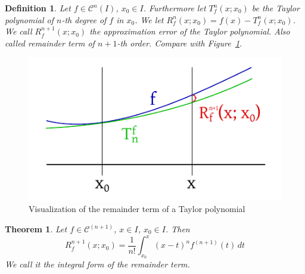 \documentclass{article}
\newtheorem{theorem}{Theorem}  \numberwithin{theorem}{section}
\newtheorem{definition}{Definition}  \numberwithin{definition}{section}
\begin{document}
\begin{definition} %
  \label{def4}
  Let $f \in \mathcal C^n(I)$, $x_0 \in I$. Furthermore let $T_f^n(x; x_0)$ be the Taylor polynomial of $n$-th degree of $f$ in $x_0$.
  We let $R_f^n(x; x_0) = f(x) - T_f^n(x; x_0)$. We call $R_f^{n+1}(x; x_0)$ the \emph{approximation error} of the Taylor polynomial.
  Also called \emph{remainder term of $n+1$-th order}. Compare with Figure~\ref{img:taylor-rem}.
\end{definition}

\begin{figure}[t]
  \begin{center}
    \includegraphics{img/27_taylor_remainder.pdf}
    \caption{Visualization of the remainder term of a Taylor polynomial}
    \label{img:taylor-rem}
  \end{center}
\end{figure}

\begin{theorem} %
  \label{thm4} 
  Let $f \in \mathcal C^{(n+1)}$, $x \in I$, $x_0 \in I$. Then
  \[ R_f^{n+1}(x; x_0) = \frac1{n!} \int_{x_0}^x (x - t)^n f^{(n+1)}(t) \, dt \]
  We call it the \emph{integral form of the remainder term}.
\end{theorem}
\end{document}

